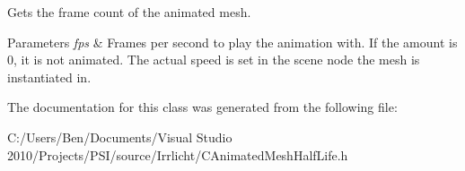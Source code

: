 Gets the frame count of the animated mesh. 


\begin{DoxyParams}{Parameters}
{\em fps} & Frames per second to play the animation with. If the amount is 0, it is not animated. The actual speed is set in the scene node the mesh is instantiated in. \\
\hline
\end{DoxyParams}


The documentation for this class was generated from the following file\-:\begin{DoxyCompactItemize}
\item 
C\-:/\-Users/\-Ben/\-Documents/\-Visual Studio 2010/\-Projects/\-P\-S\-I/source/\-Irrlicht/C\-Animated\-Mesh\-Half\-Life.\-h\end{DoxyCompactItemize}
